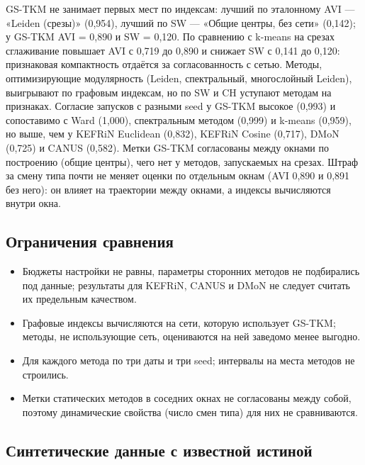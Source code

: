 \documentclass[11pt,a4paper]{article}
\providecommand{\tightlist}{\setlength{\itemsep}{1pt}\setlength{\parskip}{0pt}}
\begin{document}
GS-TKM не занимает первых мест по индексам: лучший по эталонному AVI --- «Leiden (срезы)» (0,954), лучший по SW --- «Общие центры, без сети» (0,142); у GS-TKM AVI = 0,890 и SW = 0,120. По сравнению с k-means на срезах сглаживание повышает AVI с 0,719 до 0,890 и снижает SW с 0,141 до 0,120: признаковая компактность отдаётся за согласованность с сетью. Методы, оптимизирующие модулярность (Leiden, спектральный, многослойный Leiden), выигрывают по графовым индексам, но по SW и CH уступают методам на признаках. Согласие запусков с разными seed у GS-TKM высокое (0,993) и сопоставимо с Ward (1,000), спектральным методом (0,999) и k-means (0,959), но выше, чем у KEFRiN Euclidean (0,832), KEFRiN Cosine (0,717), DMoN (0,725) и CANUS (0,582). Метки GS-TKM согласованы между окнами по построению (общие центры), чего нет у методов, запускаемых на срезах. Штраф за смену типа почти не меняет оценки по отдельным окнам (AVI 0,890 и 0,891 без него): он влияет на траектории между окнами, а индексы вычисляются внутри окна.

\subsection{Ограничения сравнения}\label{ux43eux433ux440ux430ux43dux438ux447ux435ux43dux438ux44f-ux441ux440ux430ux432ux43dux435ux43dux438ux44f}

\begin{itemize}
\tightlist
\item
  Бюджеты настройки не равны, параметры сторонних методов не подбирались под данные; результаты для KEFRiN, CANUS и DMoN не следует считать их предельным качеством.
\item
  Графовые индексы вычисляются на сети, которую использует GS-TKM; методы, не использующие сеть, оцениваются на ней заведомо менее выгодно.
\item
  Для каждого метода по три даты и три seed; интервалы на места методов не строились.
\item
  Метки статических методов в соседних окнах не согласованы между собой, поэтому динамические свойства (число смен типа) для них не сравниваются.
\end{itemize}

\subsection{Синтетические данные с известной истиной}\label{ux441ux438ux43dux442ux435ux442ux438ux447ux435ux441ux43aux438ux435-ux434ux430ux43dux43dux44bux435-ux441-ux438ux437ux432ux435ux441ux442ux43dux43eux439-ux438ux441ux442ux438ux43dux43eux439}
\end{document}
